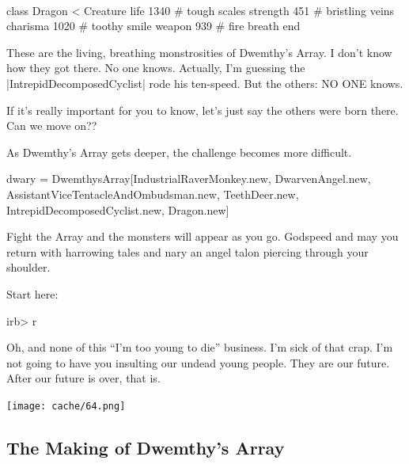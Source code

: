 \documentclass[12pt,twoside]{report}
\begin{document}
\ %

\pagebreak

\begin{rubycode}

 class Dragon < Creature
   life 1340     # tough scales
   strength 451  # bristling veins
   charisma 1020 # toothy smile
   weapon 939    # fire breath
 end

\end{rubycode}


These are the living, breathing monstrosities of Dwemthy's Array.  I
don't know how they got there.  No one knows.  Actually, I'm guessing
the \rubyinline|IntrepidDecomposedCyclist| rode his
ten-speed.  But the others: NO ONE knows.

If it's really important for you to know, let's just say the others
were born there. Can we move on??

As Dwemthy's Array gets deeper, the challenge becomes more difficult.


\begin{rubycode}

 dwary = DwemthysArray[IndustrialRaverMonkey.new,
                       DwarvenAngel.new,
                       AssistantViceTentacleAndOmbudsman.new,
                       TeethDeer.new,
                       IntrepidDecomposedCyclist.new,
                       Dragon.new]

\end{rubycode}


Fight the Array and the monsters will appear as you go.  Godspeed and
may you return with harrowing tales and nary an angel talon piercing
through your shoulder.

Start here:


\begin{consolecode}

 irb> r %

\end{consolecode}


Oh, and none of this ``I'm too young to die'' business.  I'm sick of
that crap. I'm not going to have you insulting our undead young
people.  They are our future. After our future is over, that is.

	\texttt{[image: cache/64.png]}



\subsection{The Making of Dwemthy's Array}
\end{document}
